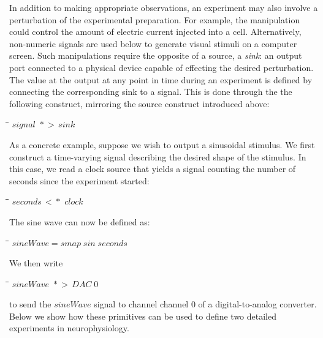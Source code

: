 \documentclass[11pt]{article}
\newlength{\lwidth}\setlength{\lwidth}{4.5cm}
\newlength{\cwidth}\setlength{\cwidth}{8mm} %
\newcommand{\Conid}[1]{\mathit{#1}}
\newcommand{\Varid}[1]{\mathit{#1}}
\begin{document}
In addition to making appropriate observations, an experiment may also
involve a perturbation of the experimental preparation. For example,
the manipulation could control the amount of electric current injected
into a cell. Alternatively, non-numeric signals are used below to
generate visual stimuli on a computer screen. Such manipulations
require the opposite of a source, a \emph{sink}: an output port connected
to a physical device capable of effecting the
desired perturbation. The value at the output at any point in time
during an experiment is defined by connecting the corresponding sink
to a signal.  This is done through the the following construct,
mirroring the source construct introduced above:
\begin{tabbing}
\qquad\=\hspace{\lwidth}\=\hspace{\cwidth}\=\+\kill
${\Varid{signal}\,\,*\!\!\!>\,\Varid{sink}}$
\end{tabbing}
As a concrete example, suppose we wish to output a sinusoidal
stimulus. We first construct a time-varying signal describing the
desired shape of the stimulus. In this case, we read a clock source
that yields a signal counting the number of seconds since the
experiment started:
\begin{tabbing}
\qquad\=\hspace{\lwidth}\=\hspace{\cwidth}\=\+\kill
${\Varid{seconds}\,<\!\!\!*\,\,\Varid{clock}}$
\end{tabbing}The sine wave can now be defined as:
\begin{tabbing}
\qquad\=\hspace{\lwidth}\=\hspace{\cwidth}\=\+\kill
${\Varid{sineWave}\mathrel{=}\Varid{smap}\;\Varid{sin}\;\Varid{seconds}}$
\end{tabbing}We then write
\begin{tabbing}
\qquad\=\hspace{\lwidth}\=\hspace{\cwidth}\=\+\kill
${\Varid{sineWave}\,\,*\!\!\!>\,\Conid{DAC}\;\mathrm{0}}$
\end{tabbing}{}
to send the \ensuremath{\Varid{sineWave}} signal to channel channel 0 of a
digital-to-analog converter. Below we show how
these primitives can be used to define two detailed experiments in
neurophysiology.
\end{document}

